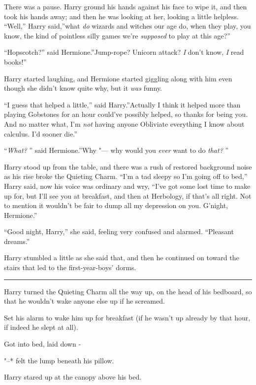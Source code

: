 There was a pause. Harry ground his hands against his face to wipe it,
and then took his hands away; and then he was looking at her, looking a
little helpless. ``Well,'' Harry said,''what \emph{do} wizards and
witches our age do, when they play, you know, the kind of pointless
silly games we're \emph{supposed} to play at this age?''

``Hopscotch?'' said Hermione.''Jump-rope? Unicorn attack? \emph{I} don't
know, \emph{I} read books!''

Harry started laughing, and Hermione started giggling along with him
even though she didn't know quite why, but it \emph{was} funny.

``I guess that helped a little,'' said Harry.''Actually I think it
helped more than playing Gobstones for an hour could've possibly helped,
so thanks for being you. And no matter what, I'm \emph{not} having
anyone Obliviate everything I know about calculus. I'd sooner die.''

``\emph{What?} '' said Hermione.''Why "--- why would you \emph{ever} want to
do \emph{that?} ''

Harry stood up from the table, and there was a rush of restored
background noise as his rise broke the Quieting Charm. ``I'm a tad
sleepy so I'm going off to bed,'' Harry said, now his voice was ordinary
and wry, ``I've got some lost time to make up for, but I'll see you at
breakfast, and then at Herbology, if that's all right. Not to mention it
wouldn't be fair to dump all my depression on you. G'night, Hermione.''

``Good night, Harry,'' she said, feeling very confused and alarmed.
``Pleasant dreams.''

Harry stumbled a little as she said that, and then he continued on
toward the stairs that led to the first-year-boys' dorms.

\begin{center}\rule{3in}{0.4pt}\end{center}

Harry turned the Quieting Charm all the way up, on the head of his
bedboard, so that he wouldn't wake anyone else up if he screamed.

Set his alarm to wake him up for breakfast (if he wasn't up already by
that hour, if indeed he slept at all).

Got into bed, laid down -

"--* felt the lump beneath his pillow.

Harry stared up at the canopy above his bed.

